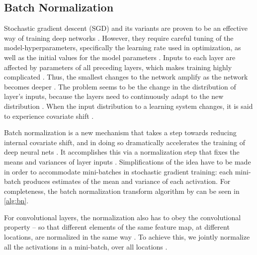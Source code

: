 \documentclass[a4paper, 11pt]{article}
\begin{document}
\subsection{Batch Normalization}
Stochastic gradient descent (SGD) and its variants are proven to be an effective way of training deep networks \cite{Ioffe2015}.
However, they require careful tuning of the model-hyperparameters, specifically the learning rate used in optimization, as well as the initial values for the model parameters \cite{Ioffe2015}.
Inputs to each layer are affected by parameters of all preceding layers, which makes training highly complicated \cite{Ioffe2015}.
Thus, the smallest changes to the network amplify as the network becomes deeper \cite{Ioffe2015}.
The problem seems to be the change in the distribution of layer's inputs, because the layers need to continuously adapt to the new distribution \cite{Ioffe2015}.
When the input distribution to a learning system changes, it is said to experience covariate shift \cite{Shimodaira2000}.

Batch normalization is a new mechanism that takes a step towards reducing internal covariate shift, and in doing so dramatically accelerates the training of deep neural nets \cite{Ioffe2015}.
It accomplishes this via a normalization step that fixes the means and variances of layer inputs \cite{Ioffe2015}.
Simplifications of the idea have to be made in order to accommodate mini-batches in stochastic gradient training: each mini-batch produces estimates of the mean and variance of each activation.
For completeness, the batch normalization transform algorithm by \citet{Ioffe2015} can be seen in \autoref{alg:bn}.

For convolutional layers, the normalization also has to obey the convolutional property – so that different elements of the same feature map, at different locations, are normalized in the same way \cite{Ioffe2015}.
To achieve this, we jointly normalize all the activations in a mini-batch, over all locations \cite{Ioffe2015}.
\end{document}
